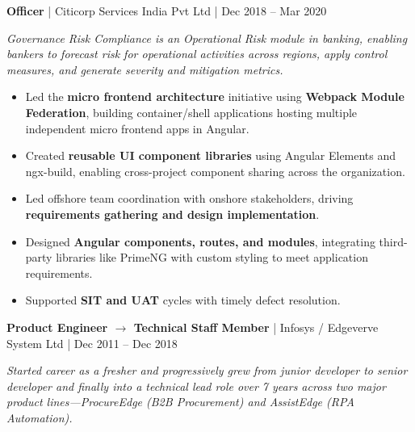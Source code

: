 \documentclass[a4paper,11pt]{article}
\newcommand{\jobtitle}[4]{
  \vspace{6pt}
  {\textbf{\textcolor{accent}{#1}} | #2 | #3}
  \vspace{2pt}
}
\begin{document}
\vspace{8pt}
\jobtitle{Officer}{Citicorp Services India Pvt Ltd}{Dec 2018 -- Mar 2020}{}

\textit{Governance Risk Compliance is an Operational Risk module in banking, enabling bankers to forecast risk for operational activities across regions, apply control measures, and generate severity and mitigation metrics.}

\begin{itemize}[leftmargin=*, nosep]
  \item Led the \textbf{micro frontend architecture} initiative using \textbf{Webpack Module Federation}, building container/shell applications hosting multiple independent micro frontend apps in Angular.
  \item Created \textbf{reusable UI component libraries} using Angular Elements and ngx-build, enabling cross-project component sharing across the organization.
  \item Led offshore team coordination with onshore stakeholders, driving \textbf{requirements gathering and design implementation}.
  \item Designed \textbf{Angular components, routes, and modules}, integrating third-party libraries like PrimeNG with custom styling to meet application requirements.
  \item Supported \textbf{SIT and UAT} cycles with timely defect resolution.
\end{itemize}

\vspace{8pt}
\jobtitle{Product Engineer $\rightarrow$ Technical Staff Member}{Infosys / Edgeverve System Ltd}{Dec 2011 -- Dec 2018}{}

\textit{Started career as a fresher and progressively grew from junior developer to senior developer and finally into a technical lead role over 7 years across two major product lines---ProcureEdge (B2B Procurement) and AssistEdge (RPA Automation).}
\end{document}
